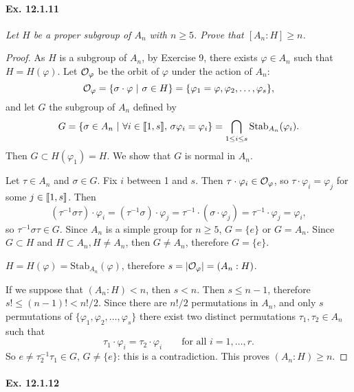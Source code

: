 \documentclass[11pt,a4paper]{article}
\def\gcro{\mbox{[\hspace{-.15em}[}}%
\def\dcro{\mbox{]\hspace{-.15em}]}}
\begin{document}
\paragraph{Ex. 12.1.11}

{\it Let $H$ be a proper subgroup of $A_n$ with $n \geq 5$. Prove that $[A_n:H] \geq n$.
}

\begin{proof}
As $H$ is a subgroup of $A_n$, by Exercise 9, there exists $\varphi \in A_n$ such that $H = H(\varphi)$. Let ${\cal O}_{\varphi}$ be the orbit of $\varphi$ under the action of $A_n$:
$${\cal O}_{\varphi} = \{\sigma \cdot \varphi\ | \ \sigma \in H\} = \{\varphi_1=\varphi, \varphi_2,\ldots,\varphi_s\},$$
and let $G$ the subgroup of $A_n$ defined by
$$G = \{\sigma \in A_n \ | \ \forall i \in \gcro 1, s \dcro,\, \sigma \varphi_i = \varphi_i\} = \bigcap_{1\leq i \leq s}\mathrm{Stab}_{A_n}(\varphi_i).$$
Then $G \subset H(\varphi_1) = H$. We show that $G$ is normal in $A_n$. 

Let $\tau \in A_n$ and $\sigma \in G$. Fix $i$ between 1 and $s$. Then $\tau \cdot \varphi_i \in {\cal O}_{\varphi}$, so $\tau \cdot \varphi_i = \varphi_j$ for some $j \in \gcro 1, s \dcro$. Then
$$(\tau^{-1} \sigma \tau)\cdot \varphi_i = (\tau^{-1} \sigma)\cdot \varphi_j = \tau^{-1} \cdot (\sigma \cdot \varphi_j) = \tau^{-1} \cdot \varphi_j = \varphi_i,$$
so $\tau^{-1} \sigma \tau \in G$.
Since $A_n$ is a simple group for $n\geq 5$, $G =\{e\}$ or $G = A_n$. Since $G \subset H$ and $H \subset A_n,H\ne A_n$, then $G \ne A_n$, therefore $G = \{e\}$.

$H = H(\varphi) = \mathrm{Stab}_{A_n}(\varphi)$, therefore $s = |{\cal O}_{\varphi}| = (A_n : H)$.

If we suppose that $(A_n:H) < n$, then $s<n$. Then $s \leq n-1$, therefore $s! \leq (n-1)! < n!/2$. Since there are $n!/2$ permutations in $A_n$, and only $s$ permutations of $ \{\varphi_1, \varphi_2,\ldots,\varphi_s\}$ there exist two distinct permutations $\tau_1,\tau_2 \in A_n$ such that
$$\tau_1\cdot \varphi_i = \tau_2 \cdot \varphi _i \qquad \text{for all } i=1,\ldots,r.$$
So $e \ne \tau_2^{-1} \tau_1 \in G$, $G \ne \{e\}$: this is a contradiction. This proves $(A_n:H) \geq n$.
\end{proof}

\paragraph{Ex. 12.1.12}
\end{document}
